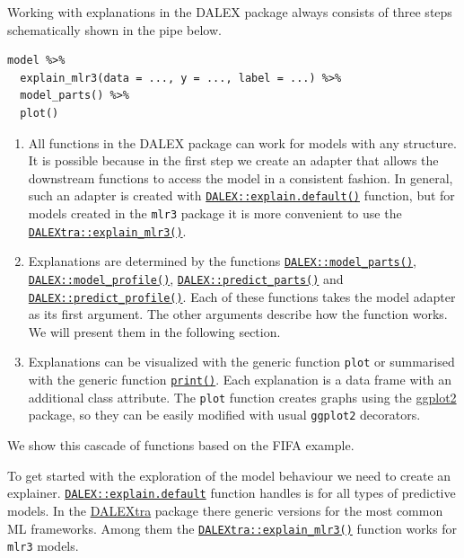 \documentclass[
]{scrbook}
\begin{document}
Working with explanations in the DALEX package always consists of three steps schematically shown in the pipe below.

\begin{verbatim}
model %>%
  explain_mlr3(data = ..., y = ..., label = ...) %>%
  model_parts() %>%
  plot()
\end{verbatim}

\begin{enumerate}
\def\labelenumi{\arabic{enumi}.}
\item
  All functions in the DALEX package can work for models with any structure. It is possible because in the first step we create an adapter that allows the downstream functions to access the model in a consistent fashion. In general, such an adapter is created with \href{https://www.rdocumentation.org/packages/DALEX/topics/explain.default}{\texttt{DALEX::explain.default()}} function, but for models created in the \texttt{mlr3} package it is more convenient to use the \href{https://www.rdocumentation.org/packages/DALEXtra/topics/explain_mlr3}{\texttt{DALEXtra::explain\_mlr3()}}.
\item
  Explanations are determined by the functions \href{https://www.rdocumentation.org/packages/DALEX/topics/model_parts}{\texttt{DALEX::model\_parts()}}, \href{https://www.rdocumentation.org/packages/DALEX/topics/model_profile}{\texttt{DALEX::model\_profile()}}, \href{https://www.rdocumentation.org/packages/DALEX/topics/predict_parts}{\texttt{DALEX::predict\_parts()}} and \href{https://www.rdocumentation.org/packages/DALEX/topics/predict_profile}{\texttt{DALEX::predict\_profile()}}. Each of these functions takes the model adapter as its first argument. The other arguments describe how the function works. We will present them in the following section.
\item
  Explanations can be visualized with the generic function \texttt{plot} or summarised with the generic function \href{https://www.rdocumentation.org/packages/base/topics/print}{\texttt{print()}}. Each explanation is a data frame with an additional class attribute. The \texttt{plot} function creates graphs using the \href{https://cran.r-project.org/package=ggplot2}{ggplot2} package, so they can be easily modified with usual \texttt{ggplot2} decorators.
\end{enumerate}

We show this cascade of functions based on the FIFA example.

To get started with the exploration of the model behaviour we need to create an explainer. \href{https://www.rdocumentation.org/packages/DALEX/topics/explain.default}{\texttt{DALEX::explain.default}} function handles is for all types of predictive models. In the \href{https://cran.r-project.org/package=DALEXtra}{DALEXtra} package there generic versions for the most common ML frameworks. Among them the \href{https://www.rdocumentation.org/packages/DALEXtra/topics/explain_mlr3}{\texttt{DALEXtra::explain\_mlr3()}} function works for \texttt{mlr3} models.
\end{document}
